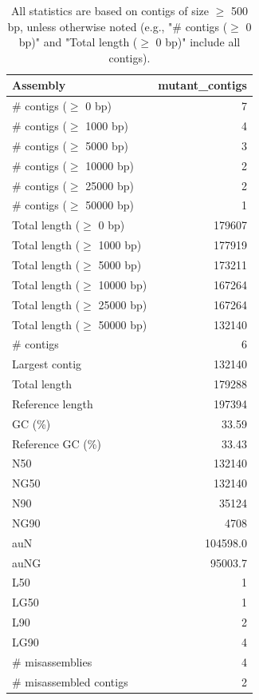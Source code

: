 \documentclass[12pt,a4paper]{article}
\begin{document}
\begin{table}[ht]
\begin{center}
\caption{All statistics are based on contigs of size $\geq$ 500 bp, unless otherwise noted (e.g., "\# contigs ($\geq$ 0 bp)" and "Total length ($\geq$ 0 bp)" include all contigs).}
\begin{tabular}{|l*{1}{|r}|}
\hline
Assembly & mutant\_contigs \\ \hline
\# contigs ($\geq$ 0 bp) & 7 \\ \hline
\# contigs ($\geq$ 1000 bp) & 4 \\ \hline
\# contigs ($\geq$ 5000 bp) & 3 \\ \hline
\# contigs ($\geq$ 10000 bp) & 2 \\ \hline
\# contigs ($\geq$ 25000 bp) & 2 \\ \hline
\# contigs ($\geq$ 50000 bp) & 1 \\ \hline
Total length ($\geq$ 0 bp) & 179607 \\ \hline
Total length ($\geq$ 1000 bp) & 177919 \\ \hline
Total length ($\geq$ 5000 bp) & 173211 \\ \hline
Total length ($\geq$ 10000 bp) & 167264 \\ \hline
Total length ($\geq$ 25000 bp) & 167264 \\ \hline
Total length ($\geq$ 50000 bp) & 132140 \\ \hline
\# contigs & 6 \\ \hline
Largest contig & 132140 \\ \hline
Total length & 179288 \\ \hline
Reference length & 197394 \\ \hline
GC (\%) & 33.59 \\ \hline
Reference GC (\%) & 33.43 \\ \hline
N50 & 132140 \\ \hline
NG50 & 132140 \\ \hline
N90 & 35124 \\ \hline
NG90 & 4708 \\ \hline
auN & 104598.0 \\ \hline
auNG & 95003.7 \\ \hline
L50 & 1 \\ \hline
LG50 & 1 \\ \hline
L90 & 2 \\ \hline
LG90 & 4 \\ \hline
\# misassemblies & 4 \\ \hline
\# misassembled contigs & 2 \\ \hline

\end{tabular}
\end{center}
\end{table}
\end{document}

